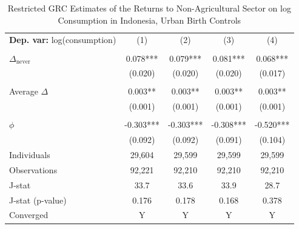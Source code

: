 \begin{table}[htbp] \centering \begin{threeparttable}
 \caption{Restricted GRC Estimates of the Returns to Non-Agricultural Sector on log Consumption in Indonesia, Urban Birth Controls} 
 \label{tab:GRC_IDN_consumption_nonag_unb_birth} 
\begin{tabular}{l cccc} \toprule  \textbf{Dep. var:}  log(consumption) 
                    &\multicolumn{1}{c}{(1)}   &\multicolumn{1}{c}{(2)}   &\multicolumn{1}{c}{(3)}   &\multicolumn{1}{c}{(4)}   \\
                    &               &               &               &               \\
\addlinespace
$\Delta_{\text{never}}$&       0.078***&       0.079***&       0.081***&       0.068***\\
                    &     (0.020)   &     (0.020)   &     (0.020)   &     (0.017)   \\
                    &               &               &               &               \\
\addlinespace
Average $\Delta$    &       0.003** &       0.003** &       0.003** &       0.003** \\
                    &     (0.001)   &     (0.001)   &     (0.001)   &     (0.001)   \\
                    &               &               &               &               \\
\addlinespace
$\phi$              &      -0.303***&      -0.303***&      -0.308***&      -0.520***\\
                    &     (0.092)   &     (0.092)   &     (0.091)   &     (0.104)   \\
\addlinespace
Individuals         &      29,604   &      29,599   &      29,599   &      29,599   \\
Observations        &      92,221   &      92,210   &      92,210   &      92,210   \\
J-stat              &        33.7   &        33.6   &        33.9   &        28.7   \\
J-stat (p-value)    &       0.176   &       0.178   &       0.168   &       0.378   \\
Converged           &           Y   &           Y   &           Y   &           Y   \\

\end{tabular}
\end{threeparttable}
\end{table}
